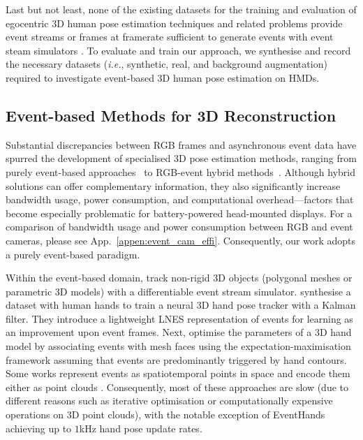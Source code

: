 Last but not least, none of the existing datasets for the training and evaluation of egocentric 3D human pose estimation techniques and related problems \citep{rhodin2016egocap, xu2019mo2cap2, tome2019xr, wang2021estimating, Zhang_ECCV_2022, wang2023scene, Pan_2023_ICCV, Khirodkar_2023_ICCV, wang2022estimating, wang2023egowholebody} provide event streams or frames at framerate sufficient to generate events with event steam simulators \citep{rebecq18a_esim}. 
To evaluate and train our approach, we synthesise and record the necessary datasets (\textit{i.e.}, synthetic, real, and background augmentation) required to investigate event-based 3D human pose estimation on HMDs. 









\subsection{Event-based Methods for 3D Reconstruction} 

Substantial discrepancies between RGB frames and asynchronous event data have spurred the development of specialised 3D pose estimation methods, ranging from purely event-based approaches~\citep{rudnev2021eventhands, Nehvi2021, Zou2021eventhpe, Wang2022EvAC3D, xue2022event, chen2022efficient, rudnev2023eventnerf, Millerdurai_3DV2024} to RGB-event hybrid methods~\citep{EventCap2020, Zou2021eventhpe, park20243d, jiang2024complementing}. 
%
Although hybrid solutions can offer complementary information, they also significantly increase bandwidth usage, power consumption, and computational overhead---factors that become especially problematic for battery-powered head-mounted displays. For a comparison of bandwidth usage and power consumption between RGB and event cameras, please see App.~\ref{appen:event_cam_effi}. 
%
Consequently, our work adopts a purely event-based paradigm.


Within the event-based domain, \citet{Nehvi2021} track non-rigid 3D objects (polygonal meshes or parametric 3D models) with 
a differentiable event stream simulator. 
\citet{rudnev2021eventhands} synthesise a 
dataset with human hands 
to train a neural 3D hand pose tracker with a Kalman filter. 
They introduce a lightweight LNES representation of events for learning as an improvement upon event frames. 
Next, \citet{xue2022event} optimise the parameters of a 3D hand model by associating events with mesh faces using the expectation-maximisation framework assuming that events are predominantly triggered by hand contours. 
Some works represent events as spatiotemporal points in space and encode them either as point clouds 
\citep{chen2022efficient, Millerdurai_3DV2024}. 
Consequently, most of these approaches are slow (due to different reasons such as iterative optimisation or computationally expensive operations on 3D point clouds), with the notable exception of EventHands \citep{rudnev2021eventhands} 
achieving up to $1$kHz hand pose update rates. 


